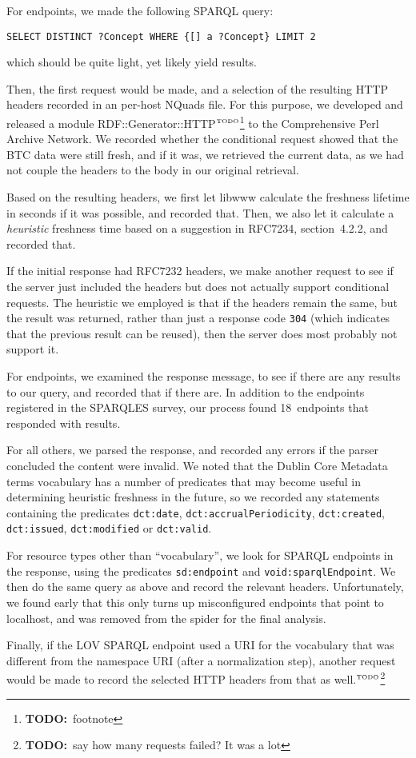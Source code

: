 \documentclass{article}
\newcommand{\rdfterm}[1]{\texttt{#1}}
\newcommand{\httph}[1]{\texttt{#1}}
\newcommand{\todo}[1]{\ensuremath{^{\textrm{\tiny{TODO}\normalsize}}}\footnote{\textbf{TODO:}~#1}}
\begin{document}
\begin{appendices}
For endpoints, we made the following SPARQL query:
\begin{verbatim}
SELECT DISTINCT ?Concept WHERE {[] a ?Concept} LIMIT 2
\end{verbatim}
which should be quite light, yet likely yield results.

Then, the first request would be made, and a selection of the
resulting HTTP headers recorded in an per-host NQuads file. For this
purpose, we developed and released a module
RDF::Generator::HTTP\todo{footnote} to the Comprehensive Perl Archive
Network. We recorded whether the conditional request showed that the
BTC data were still fresh, and if it was, we retrieved the current
data, as we had not couple the headers to the body in our original
retrieval.

Based on the resulting headers, we first let libwww calculate the
freshness lifetime in seconds if it was possible, and recorded
that. Then, we also let it calculate a \emph{heuristic} freshness
time based on a suggestion in RFC7234, section~4.2.2, and recorded that.

If the initial response had RFC7232 headers, we make another
request to see if the server just included the headers but does not
actually support conditional requests. The heuristic we employed is
that if the headers remain the same, but the result was returned,
rather than just a response code \httph{304} (which indicates that the
previous result can be reused), then the server does most probably not
support it.

For endpoints, we examined the response message, to see if there are
any results to our query, and recorded that if there are. In addition
to the endpoints registered in the SPARQLES survey, our process found
18~endpoints that responded with results.

For all others, we parsed the response, and recorded any errors if the
parser concluded the content were invalid. We noted that the Dublin Core
Metadata terms vocabulary has a number of predicates that may become
useful in determining heuristic freshness in the future, so we
recorded any statements containing the predicates \rdfterm{dct:date},
\rdfterm{dct:accrualPeriodicity}, \rdfterm{dct:created},
\rdfterm{dct:issued}, \rdfterm{dct:modified} or \rdfterm{dct:valid}.

For resource types other than ``vocabulary'', we look for SPARQL
endpoints in the response, using the predicates \rdfterm{sd:endpoint}
and \rdfterm{void:sparqlEndpoint}. We then do the same query as above
and record the relevant headers. Unfortunately, we found early that
this only turns up misconfigured endpoints that point to localhost,
and was removed from the spider for the final analysis.

Finally, if the LOV SPARQL endpoint used a URI for the vocabulary that
was different from the namespace URI (after a normalization step),
another request would be made to record the selected HTTP headers from
that as well.\todo{say how many requests failed? It was a lot}
\end{appendices}
\end{document}
